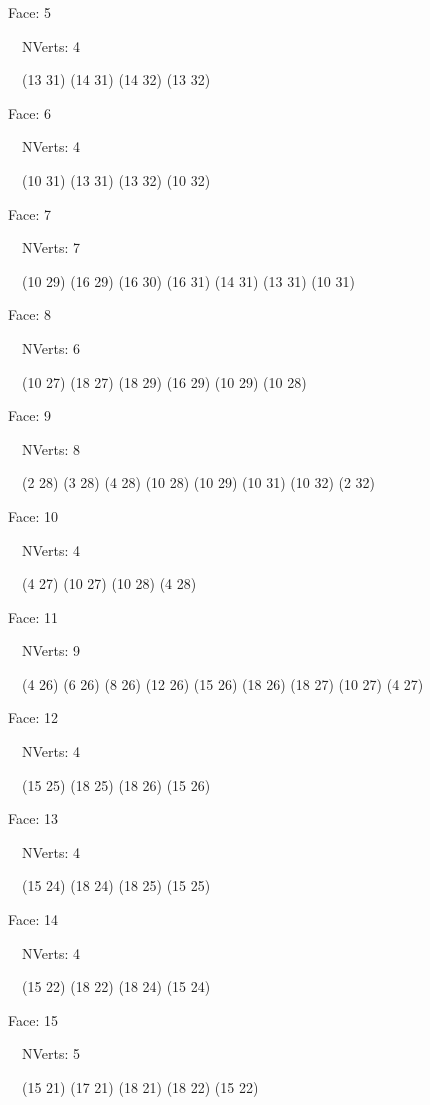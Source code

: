 \documentclass{article}
\begin{document}
{\footnotesize 

Face: 5

\   \    NVerts: 4

 \   \   (13 31) (14 31) (14 32) (13 32)}

{\footnotesize 

Face: 6

\   \    NVerts: 4

 \   \   (10 31) (13 31) (13 32) (10 32)}

{\footnotesize 

Face: 7

\   \    NVerts: 7

 \   \   (10 29) (16 29) (16 30) (16 31) (14 31) (13 31) (10 31)}

{\footnotesize 

Face: 8

\   \    NVerts: 6

 \   \   (10 27) (18 27) (18 29) (16 29) (10 29) (10 28)}

{\footnotesize 

Face: 9

\   \    NVerts: 8

 \   \   (2 28) (3 28) (4 28) (10 28) (10 29) (10 31) (10 32) (2 32)}

{\footnotesize 

Face: 10

\   \    NVerts: 4

 \   \   (4 27) (10 27) (10 28) (4 28)}

{\footnotesize 

Face: 11

\   \    NVerts: 9

 \   \   (4 26) (6 26) (8 26) (12 26) (15 26) (18 26) (18 27) (10 27) (4 27)}

{\footnotesize 

Face: 12

\   \    NVerts: 4

 \   \   (15 25) (18 25) (18 26) (15 26)}

{\footnotesize 

Face: 13

\   \    NVerts: 4

 \   \   (15 24) (18 24) (18 25) (15 25)}

{\footnotesize 

Face: 14

\   \    NVerts: 4

 \   \   (15 22) (18 22) (18 24) (15 24)}

{\footnotesize 

Face: 15

\   \    NVerts: 5

 \   \   (15 21) (17 21) (18 21) (18 22) (15 22)}
\end{document}
